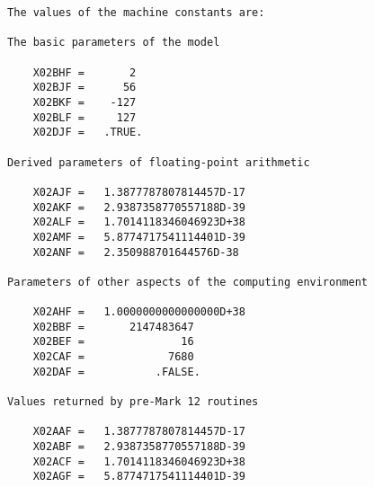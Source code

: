 \begin{small}
\begin{verbatim}
             The values of the machine constants are:                           
                                                                                
             The basic parameters of the model                                  
                                                                                
                 X02BHF =       2                                               
                 X02BJF =      56                                               
                 X02BKF =    -127                                               
                 X02BLF =     127                                               
                 X02DJF =   .TRUE.                                              
                                                                                
             Derived parameters of floating-point arithmetic                    
                                                                                
                 X02AJF =   1.3877787807814457D-17                              
                 X02AKF =   2.9387358770557188D-39                              
                 X02ALF =   1.7014118346046923D+38                              
                 X02AMF =   5.8774717541114401D-39                              
                 X02ANF =   2.350988701644576D-38                               
                                                                                
             Parameters of other aspects of the computing environment           
                                                                                
                 X02AHF =   1.0000000000000000D+38                              
                 X02BBF =       2147483647                                      
                 X02BEF =               16                                      
                 X02CAF =             7680                                      
                 X02DAF =           .FALSE.                                     
                                                                                
             Values returned by pre-Mark 12 routines                            
                                                                                
                 X02AAF =   1.3877787807814457D-17                              
                 X02ABF =   2.9387358770557188D-39                              
                 X02ACF =   1.7014118346046923D+38                              
                 X02AGF =   5.8774717541114401D-39                              
                                                                                

\end{verbatim}
\end{small}
